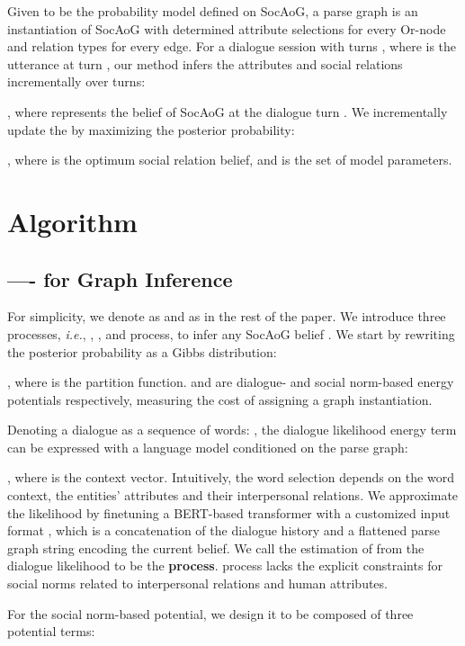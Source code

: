 \documentclass[11pt,a4paper]{article}
\begin{document}
Given  to be the probability model defined on SocAoG, a parse graph  is an instantiation of SocAoG with determined attribute selections for every Or-node and relation types for every edge. For a dialogue session with  turns , where  is the utterance at turn , our method infers the attributes and social relations incrementally over turns:

, where  represents the belief of SocAoG at the dialogue turn . We incrementally update the  by maximizing the posterior probability:

, where  is the optimum social relation belief, and  is the set of model parameters. 


\section{Algorithm}
\subsection{---- for Graph Inference}
For simplicity, we denote  as  and  as  in the rest of the paper. We introduce three processes, \textit{i.e.}, , , and  process, to infer any SocAoG belief . We start by rewriting the posterior probability as a Gibbs distribution:  

, where  is the partition function.  and  are dialogue- and social norm-based energy potentials respectively, measuring the cost of assigning a graph instantiation.

Denoting a dialogue as a sequence of words: , the dialogue likelihood energy term  can be expressed with a language model conditioned on the parse graph:

, where  is the context vector. Intuitively, the word selection depends on the word context, the entities' attributes and their interpersonal relations. 
We approximate the likelihood by finetuning a BERT-based transformer with a customized input format  , which is a concatenation of the dialogue history  and a flattened parse graph string encoding the current belief. We call the estimation of  from the dialogue likelihood  to be the \textbf{ process}.  process lacks the explicit constraints for social norms related to interpersonal relations and human attributes. 

For the social norm-based potential, we design it to be composed of three potential terms:
\end{document}
